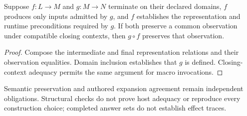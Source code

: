 \begin{theorem}
\label{thm:composition}
Suppose $f:L\to M$ and $g:M\to N$ terminate on their declared domains,
$f$ produces only inputs admitted by $g$, and $f$ establishes the representation
and runtime preconditions required by $g$. If both preserve a common observation
under compatible closing contexts, then $g\circ f$ preserves that observation.
\end{theorem}
\begin{proof}
Compose the intermediate and final representation relations and their
observation equalities. Domain inclusion establishes that $g$ is defined.
Closing-context adequacy permits the same argument for macro invocations.
\end{proof}
Semantic preservation and authored expansion agreement remain independent
obligations. Structural checks do not prove host adequacy or reproduce every
construction choice; completed answer sets do not establish effect traces.
